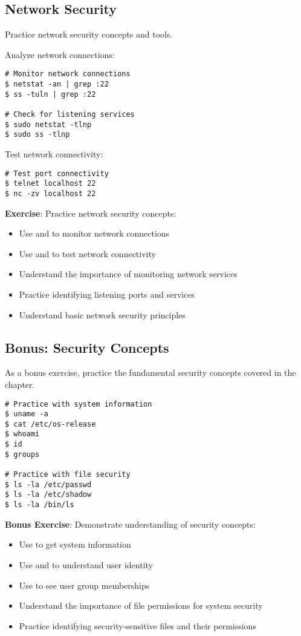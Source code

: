 \subsection{Network Security}

Practice network security concepts and tools.

Analyze network connections:

\begin{lstlisting}[style=bashstyle]
# Monitor network connections
$ netstat -an | grep :22
$ ss -tuln | grep :22

# Check for listening services
$ sudo netstat -tlnp
$ sudo ss -tlnp
\end{lstlisting}

Test network connectivity:

\begin{lstlisting}[style=bashstyle]
# Test port connectivity
$ telnet localhost 22
$ nc -zv localhost 22
\end{lstlisting}

\textbf{Exercise}: Practice network security concepts:
\begin{itemize}
    \item Use  and  to monitor network connections
    \item Use  and  to test network connectivity
    \item Understand the importance of monitoring network services
    \item Practice identifying listening ports and services
    \item Understand basic network security principles
\end{itemize}

\subsection{Bonus: Security Concepts}

As a bonus exercise, practice the fundamental security concepts covered in the chapter.

\begin{lstlisting}[style=bashstyle]
# Practice with system information
$ uname -a
$ cat /etc/os-release
$ whoami
$ id
$ groups

# Practice with file security
$ ls -la /etc/passwd
$ ls -la /etc/shadow
$ ls -la /bin/ls
\end{lstlisting}

\textbf{Bonus Exercise}: Demonstrate understanding of security concepts:
\begin{itemize}
    \item Use  to get system information
    \item Use  and  to understand user identity
    \item Use  to see user group memberships
    \item Understand the importance of file permissions for system security
    \item Practice identifying security-sensitive files and their permissions
\end{itemize}
